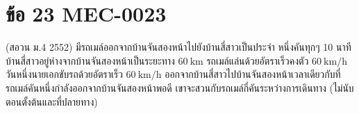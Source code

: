\section*{ข้อ 23 \hfill \normalsize MEC-0023}
(สอวน ม.4 2552) มีรถเมล์ออกจากบ้านจันสองหน้าไปยังบ้านสี่สาวเป็นประจำ หนึ่งคันทุกๆ 10 นาที บ้านสี่สาวอยู่ห่างจากบ้านจันสองหน้าเป็นระยะทาง $60\ \mathrm{km}$ รถเมล์แล่นด้วยอัตราเร็วคงตัว $60\ \mathrm{km/h}$ วันหนึ่งนายเอกขับรถด้วยอัตราเร็ว $60\ \mathrm{km/h}$ ออกจากบ้านสี่สาวไปบ้านจันสองหน้าเวลาเดียวกับที่รถเมล์คันหนึ่งกำลังออกจากบ้านจันสองหน้าพอดี เขาจะสวนกับรถเมล์กี่คันระหว่างการเดินทาง (ไม่นับตอนตั้งต้นและที่ปลายทาง)
\medskip

